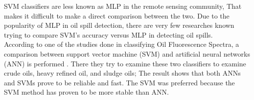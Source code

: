 



 
SVM classifiers are less known as MLP in the remote sensing community, That makes it difficult to make a direct comparison between the two. Due to the popularity of MLP in oil spill detection, there are very few researches known trying to compare SVM's accuracy versus MLP in detecting oil spills.\\ 

According to one of the studies done in classifying Oil Fluorescence Spectra, a comparison between support vector machine (SVM) and artificial neural networks (ANN) is performed \cite{almhdi2007classification}. There they try to examine these two classifiers to examine crude oils, heavy refined oil, and sludge oils; The result shows that both ANNs and SVMs prove to be reliable and fast. The SVM was preferred because the SVM method has proven to be more stable than ANN.\\


